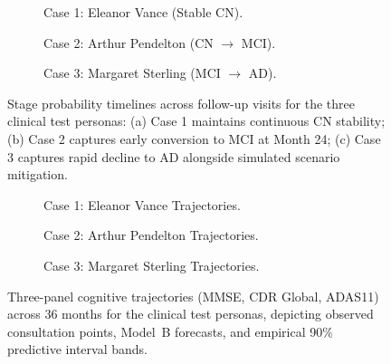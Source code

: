 \documentclass[11pt,a4paper]{article}
\begin{document}
\begin{figure}[t]
\centering
\begin{subfigure}[t]{0.32\linewidth}
    \centering
    \caption{Case 1: Eleanor Vance (Stable CN).}
    \label{fig:stage_prob_timeline_case1}
\end{subfigure}
\hfill
\begin{subfigure}[t]{0.32\linewidth}
    \centering
    \caption{Case 2: Arthur Pendelton (CN $\to$ MCI).}
    \label{fig:stage_prob_timeline_case2}
\end{subfigure}
\hfill
\begin{subfigure}[t]{0.32\linewidth}
    \centering
    \caption{Case 3: Margaret Sterling (MCI $\to$ AD).}
    \label{fig:stage_prob_timeline_case3}
\end{subfigure}
\caption{Stage probability timelines across follow-up visits for the three clinical test personas: (a) Case 1 maintains continuous CN stability; (b) Case 2 captures early conversion to MCI at Month 24; (c) Case 3 captures rapid decline to AD alongside simulated scenario mitigation.}
\label{fig:persona_timelines}
\end{figure}

\begin{figure}[t]
\centering
\begin{subfigure}[t]{0.32\linewidth}
    \centering
    \caption{Case 1: Eleanor Vance Trajectories.}
    \label{fig:trajectory_panels_case1}
\end{subfigure}
\hfill
\begin{subfigure}[t]{0.32\linewidth}
    \centering
    \caption{Case 2: Arthur Pendelton Trajectories.}
    \label{fig:trajectory_panels_case2}
\end{subfigure}
\hfill
\begin{subfigure}[t]{0.32\linewidth}
    \centering
    \caption{Case 3: Margaret Sterling Trajectories.}
    \label{fig:trajectory_panels_case3}
\end{subfigure}
\caption{Three-panel cognitive trajectories (MMSE, CDR Global, ADAS11) across 36 months for the clinical test personas, depicting observed consultation points, Model~B forecasts, and empirical 90\% predictive interval bands.}
\label{fig:patient_trajectories}
\end{figure}
\end{document}
